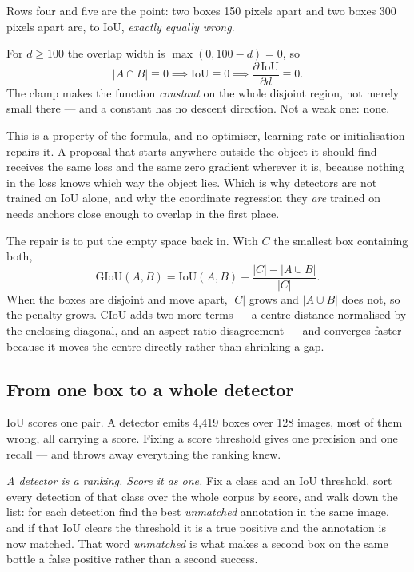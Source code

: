 \documentclass[11pt,a4paper]{article}
\begin{document}
Rows four and five are the point: two boxes 150 pixels apart and two boxes 300
pixels apart are, to IoU, \emph{exactly equally wrong}.

\begin{derivbox}[title={Why the gradient is exactly zero, not merely small}]
For $d \ge 100$ the overlap width is $\max(0, 100-d) = 0$, so
\[ |A \cap B| \equiv 0
   \implies \mathrm{IoU} \equiv 0
   \implies \frac{\partial\,\mathrm{IoU}}{\partial d} \equiv 0. \]
The clamp makes the function \emph{constant} on the whole disjoint region, not
merely small there --- and a constant has no descent direction. Not a weak one:
none.
\end{derivbox}

This is a property of the formula, and no optimiser, learning rate or
initialisation repairs it. A proposal that starts anywhere outside the object
it should find receives the same loss and the same zero gradient wherever it
is, because nothing in the loss knows which way the object lies. Which is why
detectors are not trained on IoU alone, and why the coordinate regression they
\emph{are} trained on needs anchors close enough to overlap in the first place.

The repair is to put the empty space back in. With $C$ the smallest box
containing both,
\[ \mathrm{GIoU}(A,B) = \mathrm{IoU}(A,B)
   - \frac{|C| - |A \cup B|}{|C|}. \]
When the boxes are disjoint and move apart, $|C|$ grows and $|A \cup B|$ does
not, so the penalty grows. CIoU adds two more terms --- a centre distance
normalised by the enclosing diagonal, and an aspect-ratio disagreement --- and
converges faster because it moves the centre directly rather than shrinking a
gap.

\subsection{From one box to a whole detector}

IoU scores one pair. A detector emits 4{,}419 boxes over 128 images, most of
them wrong, all carrying a score. Fixing a score threshold gives one precision
and one recall --- and throws away everything the ranking knew.

\emph{A detector is a ranking. Score it as one.} Fix a class and an IoU
threshold, sort every detection of that class over the whole corpus by score,
and walk down the list: for each detection find the best \emph{unmatched}
annotation in the same image, and if that IoU clears the threshold it is a true
positive and the annotation is now matched. That word \emph{unmatched} is what
makes a second box on the same bottle a false positive rather than a second
success.
\end{document}
